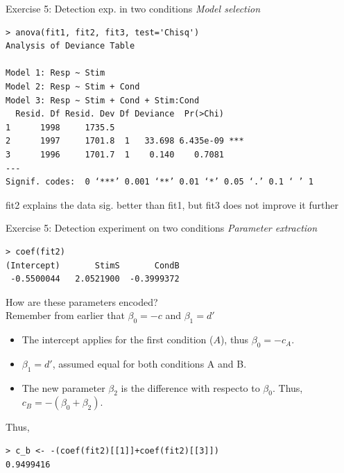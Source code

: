 \documentclass[10pt]{beamer}
\begin{document}
\begin{frame}[fragile]{Exercise 5: Detection exp. in two conditions}
\textit{Model selection}

\begin{verbatim}
> anova(fit1, fit2, fit3, test='Chisq')
Analysis of Deviance Table

Model 1: Resp ~ Stim
Model 2: Resp ~ Stim + Cond
Model 3: Resp ~ Stim + Cond + Stim:Cond
  Resid. Df Resid. Dev Df Deviance  Pr(>Chi)    
1      1998     1735.5                          
2      1997     1701.8  1   33.698 6.435e-09 ***
3      1996     1701.7  1    0.140    0.7081    
---
Signif. codes:  0 ‘***’ 0.001 ‘**’ 0.01 ‘*’ 0.05 ‘.’ 0.1 ‘ ’ 1
\end{verbatim}



\alert{fit2 explains the data sig. better than fit1, but fit3 does not improve it further}
\end{frame}

\begin{frame}[fragile]{Exercise 5: Detection experiment on two conditions}
\textit{Parameter extraction}
\begin{verbatim}
> coef(fit2)
(Intercept)       StimS       CondB 
 -0.5500044   2.0521900  -0.3999372 
\end{verbatim}

How are these parameters encoded?\\[10pt]
\pause
Remember from earlier that $\beta_0 = -c$ and $\beta_1 = d'$\\[5pt]

\begin{itemize}
\item The intercept applies for the first condition ($A$), thus
$\beta_0 = -c_A$.
\item $\beta_1 = d'$, assumed equal for both conditions A and B.
\item The new parameter $\beta_2$ is the difference with respecto to $\beta_0$. Thus, $c_B = - (\beta_0 + \beta_2)$.
\end{itemize}

Thus,
\begin{verbatim}
> c_b <- -(coef(fit2)[[1]]+coef(fit2)[[3]])
0.9499416
\end{verbatim}
\end{frame}



\end{document}
